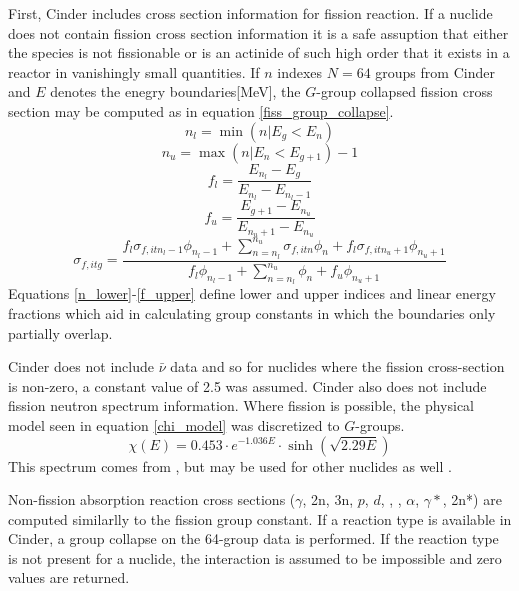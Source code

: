 First, Cinder includes cross section information for fission reaction.  If a nuclide does not 
contain fission cross section information it is a safe assuption that either the species 
is not fissionable or is an actinide of such high order that it exists in a reactor in vanishingly 
small quantities.  If $n$ indexes $N=64$ groups from Cinder and $E$ denotes the enegry boundaries[MeV], 
the $G$-group collapsed fission cross section may be computed as in equation \ref{fiss_group_collapse}.
\begin{equation}
\label{n_lower}
n_l = \min(n|E_g<E_n)
\end{equation}
\begin{equation}
\label{n_upper}
n_u = \max(n|E_n<E_{g+1}) - 1
\end{equation}
\begin{equation}
\label{f_lower}
f_l = \frac{E_{n_l} - E_g}{E_{n_l} - E_{n_l-1}}
\end{equation}
\begin{equation}    
\label{f_upper}
f_u = \frac{E_{g+1} - E_{n_u}}{E_{n_u+1} - E_{n_u}}
\end{equation}
\begin{equation}
\label{fiss_group_collapse}
\sigma_{f,itg} = \frac{f_l\sigma_{f,itn_l-1}\phi_{n_l-1} + \sum_{n=n_l}^{n_u} \sigma_{f,itn}\phi_n + f_l\sigma_{f,itn_u+1}\phi_{n_u+1}}{f_l\phi_{n_l-1} + \sum_{n=n_l}^{n_u} \phi_n  + f_u\phi_{n_u+1}}
\end{equation}
Equations \ref{n_lower}-\ref{f_upper} define lower and upper indices and linear energy fractions
which aid in calculating group constants in which the boundaries only partially overlap.

Cinder does not include $\bar{\nu}$ data and so for nuclides where the fission cross-section is 
non-zero, a constant value of 2.5 was assumed. Cinder also does not include fission neutron 
spectrum information.  Where fission is possible, the physical model seen in equation \ref{chi_model}
was discretized to $G$-groups.
\begin{equation}
\label{chi_model}
\chi(E) = 0.453 \cdot e^{-1.036E} \cdot \sinh\left(\sqrt{2.29E}\right)
\end{equation}
This spectrum comes from , but may be used for other nuclides as well \cite{Lamarsh2002}.

Non-fission absorption reaction cross sections ($\gamma$, 2n, 3n, $p$, $d$, , , 
$\alpha$, $\gamma*$, 2n*) are computed similarlly to the fission group constant.  If a reaction 
type is available in Cinder, a group collapse on the 64-group data is performed.  If the reaction 
type is not present for a nuclide, the interaction is assumed to be impossible and zero values
are returned.

